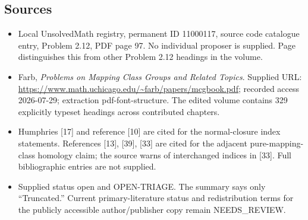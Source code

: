 \documentclass[11pt]{article}
\begin{document}
\subsection{Sources}
\begin{itemize}
\item Local UnsolvedMath registry, permanent ID 11000117, source code catalogue entry, Problem 2.12, PDF page 97. No individual proposer is supplied. Page distinguishes this from other Problem 2.12 headings in the volume.
\item Farb, \emph{Problems on Mapping Class Groups and Related Topics}. Supplied URL: \url{https://www.math.uchicago.edu/~farb/papers/mcgbook.pdf}; recorded access 2026-07-29; extraction pdf-font-structure. The edited volume contains 329 explicitly typeset headings across contributed chapters.
\item Humphries [17] and reference [10] are cited for the normal-closure index statements. References [13], [39], [33] are cited for the adjacent pure-mapping-class homology claim; the source warns of interchanged indices in [33]. Full bibliographic entries are not supplied.
\item Supplied status open and OPEN-TRIAGE. The summary says only ``Truncated.'' Current primary-literature status and redistribution terms for the publicly accessible author/publisher copy remain NEEDS\_REVIEW.
\end{itemize}
\end{document}
